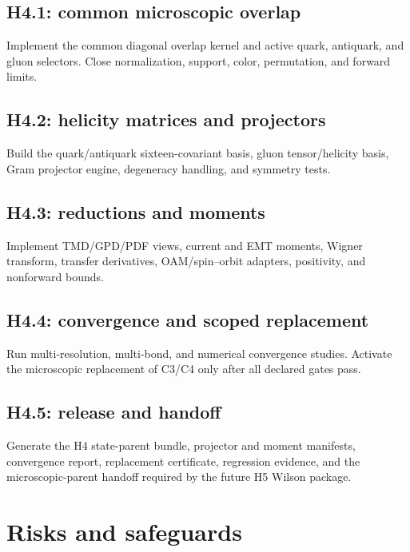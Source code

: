 \documentclass[11pt]{article}
\begin{document}
\subsection{H4.1: common microscopic overlap}

Implement the common diagonal overlap kernel and active quark, antiquark, and
gluon selectors.  Close normalization, support, color, permutation, and
forward limits.

\subsection{H4.2: helicity matrices and projectors}

Build the quark/antiquark sixteen-covariant basis, gluon tensor/helicity basis,
Gram projector engine, degeneracy handling, and symmetry tests.

\subsection{H4.3: reductions and moments}

Implement TMD/GPD/PDF views, current and EMT moments, Wigner transform, transfer
derivatives, OAM/spin--orbit adapters, positivity, and nonforward bounds.

\subsection{H4.4: convergence and scoped replacement}

Run multi-resolution, multi-bond, and numerical convergence studies.  Activate
the microscopic replacement of C3/C4 only after all declared gates pass.

\subsection{H4.5: release and handoff}

Generate the H4 state-parent bundle, projector and moment manifests,
convergence report, replacement certificate, regression evidence, and the
microscopic-parent handoff required by the future H5 Wilson package.

\section{Risks and safeguards}
\label{sec:risks}
\end{document}
